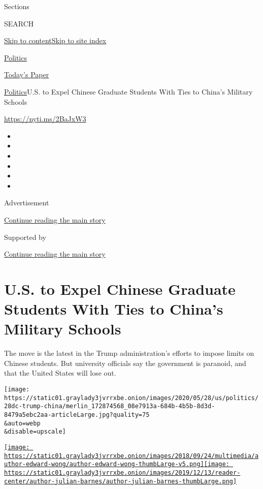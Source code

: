 Sections

SEARCH

\protect\hyperlink{site-content}{Skip to
content}\protect\hyperlink{site-index}{Skip to site index}

\href{https://www.nytimes3xbfgragh.onion/section/politics}{Politics}

\href{https://myaccount.nytimes3xbfgragh.onion/auth/login?response_type=cookie\&client_id=vi}{}

\href{https://www.nytimes3xbfgragh.onion/section/todayspaper}{Today's
Paper}

\href{/section/politics}{Politics}\textbar{}U.S. to Expel Chinese
Graduate Students With Ties to China's Military Schools

\url{https://nyti.ms/2BaJxW3}

\begin{itemize}
\item
\item
\item
\item
\item
\item
\end{itemize}

Advertisement

\protect\hyperlink{after-top}{Continue reading the main story}

Supported by

\protect\hyperlink{after-sponsor}{Continue reading the main story}

\hypertarget{us-to-expel-chinese-graduate-students-with-ties-to-chinas-military-schools}{%
\section{U.S. to Expel Chinese Graduate Students With Ties to China's
Military
Schools}\label{us-to-expel-chinese-graduate-students-with-ties-to-chinas-military-schools}}

The move is the latest in the Trump administration's efforts to impose
limits on Chinese students. But university officials say the government
is paranoid, and that the United States will lose out.

\texttt{[image: https://static01.graylady3jvrrxbe.onion/images/2020/05/28/us/politics/28dc-trump-china/merlin\_172874568\_08e7913a-684b-4b5b-8d3d-8479a5ebc2aa-articleLarge.jpg?quality=75\\\&auto=webp\\\&disable=upscale]}

\href{https://www.nytimes3xbfgragh.onion/by/edward-wong}{\texttt{[image: https://static01.graylady3jvrrxbe.onion/images/2018/09/24/multimedia/author-edward-wong/author-edward-wong-thumbLarge-v5.png]}}\href{https://www.nytimes3xbfgragh.onion/by/julian-e-barnes}{\texttt{[image: https://static01.graylady3jvrrxbe.onion/images/2019/12/13/reader-center/author-julian-barnes/author-julian-barnes-thumbLarge.png]}}

